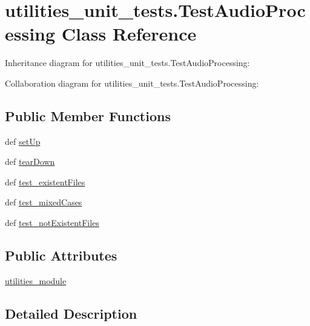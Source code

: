 \hypertarget{classutilities__unit__tests_1_1TestAudioProcessing}{\section{utilities\-\_\-unit\-\_\-tests.\-Test\-Audio\-Processing Class Reference}
\label{classutilities__unit__tests_1_1TestAudioProcessing}
}


Inheritance diagram for utilities\-\_\-unit\-\_\-tests.\-Test\-Audio\-Processing\-:


Collaboration diagram for utilities\-\_\-unit\-\_\-tests.\-Test\-Audio\-Processing\-:
\subsection*{Public Member Functions}
\begin{DoxyCompactItemize}
\item 
def \hyperlink{classutilities__unit__tests_1_1TestAudioProcessing_a64e2426fc2a035849341bf3583280b44}{set\-Up}
\item 
def \hyperlink{classutilities__unit__tests_1_1TestAudioProcessing_aec5f7490f917d74954baabeb4981027b}{tear\-Down}
\item 
def \hyperlink{classutilities__unit__tests_1_1TestAudioProcessing_aeda2f9f156cf866e541b4f9f4ffd7dc7}{test\-\_\-existent\-Files}
\item 
def \hyperlink{classutilities__unit__tests_1_1TestAudioProcessing_a2450e3d718cbb9f5c365f7dc11875df3}{test\-\_\-mixed\-Cases}
\item 
def \hyperlink{classutilities__unit__tests_1_1TestAudioProcessing_a39c6e0913b06620a9e7118b5021c1cb7}{test\-\_\-not\-Existent\-Files}
\end{DoxyCompactItemize}
\subsection*{Public Attributes}
\begin{DoxyCompactItemize}
\item 
\hyperlink{classutilities__unit__tests_1_1TestAudioProcessing_a8f0150434b471b9822c2d6ff1f89ca4f}{utilities\-\_\-module}
\end{DoxyCompactItemize}


\subsection{Detailed Description}


